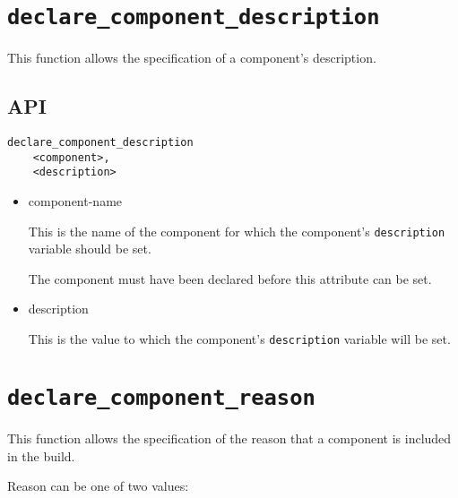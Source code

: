 \section{\texttt{declare\_component\_description}}\label{api:description}

This function allows the specification of a component's description.

\subsection{API}

\begin{verbatim}
declare_component_description
    <component>,
    <description>
\end{verbatim}

\begin{itemize}
\item component-name

  This is the name of the component for which the component's
  \texttt{description} variable should be set.

  The component must have been declared before this attribute can be
  set.

\item description

  This is the value to which the component's \texttt{description}
  variable will be set.

\end{itemize}

\section{\texttt{declare\_component\_reason}}\label{api:reason}

This function allows the specification of the reason that a component
is included in the build.

  Reason can be one of two values:

